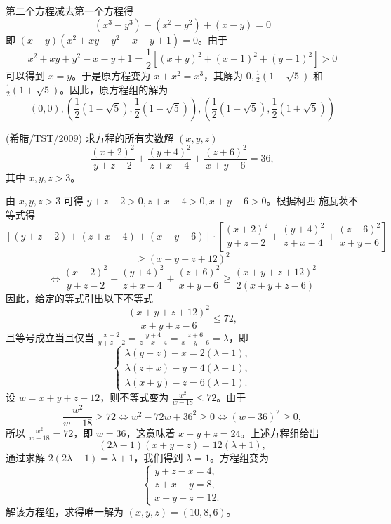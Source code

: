 \begin{questions}
\begin{solution}
第二个方程减去第一个方程得
\[
(x^3 - y^3) - (x^2 - y^2) + (x - y) = 0
\]
即 $(x - y)(x^2 + xy + y^2 - x - y + 1) = 0$。由于
\[
x^2 + xy + y^2 - x - y + 1 = \frac{1}{2}\left[ (x + y)^2 + (x - 1)^2 + (y - 1)^2 \right] > 0
\]
可以得到 $x = y$。于是原方程变为 $x + x^2 = x^3$，其解为 $0, \frac{1}{2}(1 - \sqrt{5})$ 和 $\frac{1}{2}(1 + \sqrt{5})$。因此，原方程组的解为
\[
(0, 0), \left( \frac{1}{2}(1 - \sqrt{5}), \frac{1}{2}(1 - \sqrt{5}) \right), \left( \frac{1}{2}(1 + \sqrt{5}), \frac{1}{2}(1 + \sqrt{5}) \right)
\]
\end{solution}

    \question (希腊/TST/2009) 求方程的所有实数解 $(x, y, z)$
\[
\frac{(x + 2)^2}{y + z - 2} + \frac{(y + 4)^2}{z + x - 4} + \frac{(z + 6)^2}{x + y - 6} = 36,
\]
其中 $x, y, z > 3$。

\begin{solution}
由 $x, y, z > 3$ 可得 $y + z - 2 > 0, z + x - 4 > 0, x + y - 6 > 0$。根据柯西-施瓦茨不等式得
\[
\left[ (y + z - 2) + (z + x - 4) + (x + y - 6) \right] \cdot \left[ \frac{(x + 2)^2}{y + z - 2} + \frac{(y + 4)^2}{z + x - 4} + \frac{(z + 6)^2}{x + y - 6} \right]
\]
\[
\ge (x + y + z + 12)^2
\]
\[
\Leftrightarrow \frac{(x + 2)^2}{y + z - 2} + \frac{(y + 4)^2}{z + x - 4} + \frac{(z + 6)^2}{x + y - 6} \ge \frac{(x + y + z + 12)^2}{2(x + y + z - 6)}
\]
因此，给定的等式引出以下不等式
\[
\frac{(x + y + z + 12)^2}{x + y + z - 6} \le 72,
\]
且等号成立当且仅当 $\frac{x + 2}{y + z - 2} = \frac{y + 4}{z + x - 4} = \frac{z + 6}{x + y - 6} = \lambda$，即
\[
\begin{cases} \lambda(y + z) - x = 2(\lambda + 1), \\ \lambda(z + x) - y = 4(\lambda + 1), \\ \lambda(x + y) - z = 6(\lambda + 1). \end{cases}
\]
设 $w = x + y + z + 12$，则不等式变为 $\frac{w^2}{w - 18} \le 72$。由于
\[
\frac{w^2}{w - 18} \ge 72 \Leftrightarrow w^2 - 72w + 36^2 \ge 0 \Leftrightarrow (w - 36)^2 \ge 0,
\]
所以 $\frac{w^2}{w - 18} = 72$，即 $w = 36$，这意味着 $x + y + z = 24$。上述方程组给出
\[
(2\lambda - 1)(x + y + z) = 12(\lambda + 1),
\]
通过求解 $2(2\lambda - 1) = \lambda + 1$，我们得到 $\lambda = 1$。方程组变为
\[
\begin{cases} y + z - x = 4, \\ z + x - y = 8, \\ x + y - z = 12. \end{cases}
\]
解该方程组，求得唯一解为 $(x, y, z) = (10, 8, 6)$。
\end{solution}


\end{questions}
